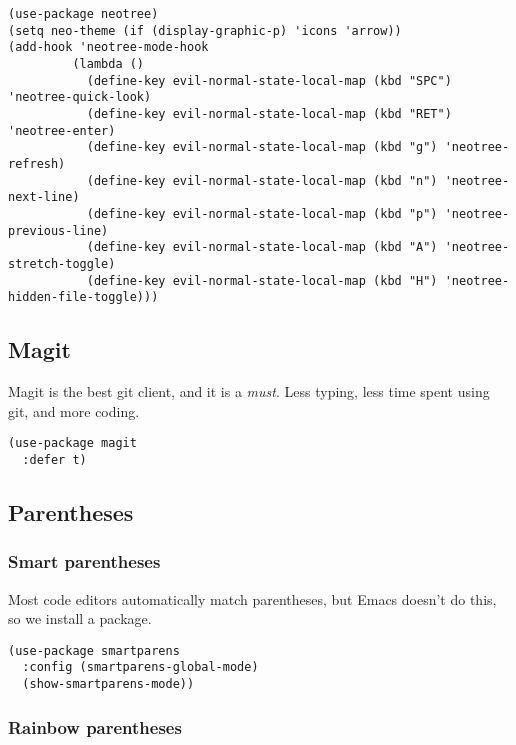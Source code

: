 \documentclass[11pt]{article}
\begin{document}
\begin{verbatim}
(use-package neotree)
(setq neo-theme (if (display-graphic-p) 'icons 'arrow))
(add-hook 'neotree-mode-hook
         (lambda ()
           (define-key evil-normal-state-local-map (kbd "SPC") 'neotree-quick-look)
           (define-key evil-normal-state-local-map (kbd "RET") 'neotree-enter)
           (define-key evil-normal-state-local-map (kbd "g") 'neotree-refresh)
           (define-key evil-normal-state-local-map (kbd "n") 'neotree-next-line)
           (define-key evil-normal-state-local-map (kbd "p") 'neotree-previous-line)
           (define-key evil-normal-state-local-map (kbd "A") 'neotree-stretch-toggle)
           (define-key evil-normal-state-local-map (kbd "H") 'neotree-hidden-file-toggle)))
\end{verbatim}

\subsection*{Magit}
\label{sec:org6a1c149}

Magit is the best git client, and it is a \emph{must}. Less typing, less time spent using git, and more coding.

\begin{verbatim}
(use-package magit
  :defer t)
\end{verbatim}

\subsection*{Parentheses}
\label{sec:org5e142a2}

\subsubsection*{Smart parentheses}
\label{sec:orgf65daf8}

Most code editors automatically match parentheses, but Emacs doesn't do this, so we install a package.

\begin{verbatim}
(use-package smartparens
  :config (smartparens-global-mode)
  (show-smartparens-mode))
\end{verbatim}

\subsubsection*{Rainbow parentheses}
\label{sec:org3d2152c}
\end{document}
